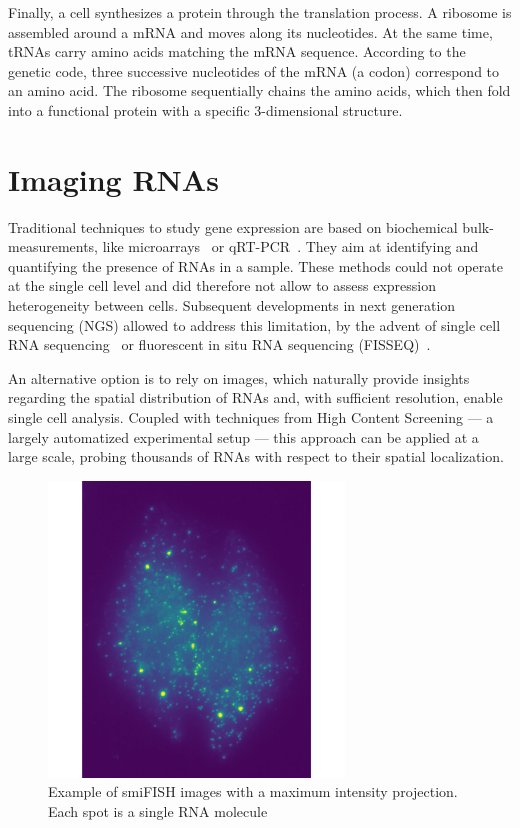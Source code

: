 Finally, a cell synthesizes a protein through the translation process.
A ribosome is assembled around a \ac{mRNA} and moves along its nucleotides.
At the same time, \ac{tRNA}s carry amino acids matching the \ac{mRNA} sequence.
According to the genetic code, three successive nucleotides of the \ac{mRNA} (a codon) correspond to an amino acid.
The ribosome sequentially chains the amino acids, which then fold into a functional protein with a specific 3-dimensional structure.

\section{Imaging RNAs}
\label{sec:fish}

Traditional techniques to study gene expression are based on biochemical bulk-measurements, like microarrays~\cite{Schena_1995} or qRT-PCR~\cite{bustin_absolute_2000}.
They aim at identifying and quantifying the presence of \ac{RNA}s in a sample.
These methods could not operate at the single cell level and did therefore not allow to assess expression heterogeneity between cells.
Subsequent developments in next generation sequencing (NGS) allowed to address this limitation, by the advent of single cell \ac{RNA} sequencing~\cite{Hedlund_2018} or fluorescent in situ \ac{RNA} sequencing (FISSEQ)~\cite{Church_2014}.

An alternative option is to rely on images, which naturally provide insights regarding the spatial distribution of \ac{RNA}s and, with sufficient resolution, enable single cell analysis.
Coupled with techniques from High Content Screening --- a largely automatized experimental setup --- this approach can be applied at a large scale, probing thousands of \ac{RNA}s with respect to their spatial localization.

\begin{figure}[]
    \centering
    \includegraphics[width=0.7\textwidth]{figures/introduction/multichannel_input}
	\caption[Example of smiFISH image]{Example of smiFISH images with a maximum intensity projection.
	Each spot is a single RNA molecule}
    \label{fig:smFISH_input}
\end{figure}


